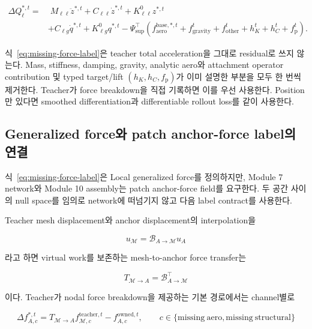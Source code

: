 \documentclass[11pt,a4paper]{article}
\begin{document}
\begin{equation}
\begin{aligned}
  \Delta Q_{\ell}^{*,t}
  =&\;
  M_{\ell\ell}\ddot z^{*,t}
  +C_{\ell\ell}\dot z^{*,t}
  +K_{\ell\ell}^{0}z^{*,t}\\
  &+C_{\ell g}\dot q^{*,t}
  +K_{\ell g}^{0}q^{*,t}
  -\Psi_{\mathrm{sup}}^\top
  \left(
    f_{\mathrm{aero}}^{\mathrm{base},*,t}
    +f_{\mathrm{gravity}}^t
    +f_{\mathrm{other}}^t
    +h_K^t+h_C^t+f_{\mathrm p}^t
  \right).
  \label{eq:missing-force-label}
\end{aligned}
\end{equation}

식~\eqref{eq:missing-force-label}은 teacher total acceleration을 그대로 residual로 쓰지 않는다.
Mass, stiffness, damping, gravity, analytic aero와 attachment operator contribution 및
typed target/lift \((h_K,h_C,f_{\mathrm p})\)가 이미 설명한 부분을 모두 한 번씩 제거한다.
Teacher가 force breakdown을 직접 기록하면 이를 우선 사용한다.
Position만 있다면 smoothed differentiation과 differentiable rollout loss를 같이 사용한다.

\subsection{Generalized force와 patch anchor-force label의 연결}

식~\eqref{eq:missing-force-label}은 Local generalized force를 정의하지만,
Module 7 network와 Module 10 assembly는 patch anchor-force field를 요구한다.
두 공간 사이의 null space를 임의로 network에 떠넘기지 않고 다음 label contract를 사용한다.

Teacher mesh displacement와 anchor displacement의 interpolation을

\begin{equation}
  u_{\mathcal M}
  =
  \mathcal B_{A\rightarrow\mathcal M}u_A
\end{equation}

라고 하면 virtual work를 보존하는 mesh-to-anchor force transfer는

\begin{equation}
  T_{\mathcal M\rightarrow A}
  =
  \mathcal B_{A\rightarrow\mathcal M}^{\top}
\end{equation}

이다. Teacher가 nodal force breakdown을 제공하는 기본 경로에서는 channel별로

\begin{equation}
  \Delta f_{A,c}^{*,t}
  =
  T_{\mathcal M\rightarrow A}f_{\mathcal M,c}^{\mathrm{teacher},t}
  -f_{A,c}^{\mathrm{owned},t},
  \qquad
  c\in\{\mathrm{missing\ aero},\mathrm{missing\ structural}\}
  \label{eq:teacher-anchor-force-label}
\end{equation}
\end{document}
